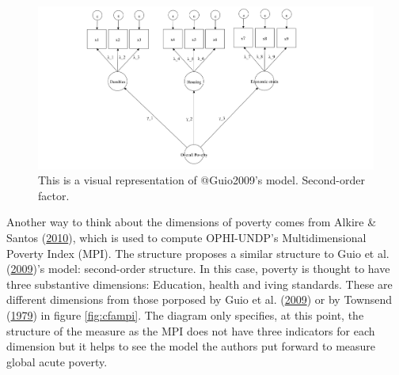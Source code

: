\documentclass[]{book}
\begin{document}
\begin{figure}[H]

{\centering \includegraphics[width=\textwidth]{Diagram_CFA_GuioModel} 

}

\caption{This is a visual representation of @Guio2009's model. Second-order factor.}\label{fig:cfaguio}
\end{figure}

Another way to think about the dimensions of poverty comes from Alkire \& Santos (\protect\hyperlink{ref-Alkire2010}{2010}), which is used to compute OPHI-UNDP's Multidimensional Poverty Index (MPI). The structure proposes a similar structure to Guio et al. (\protect\hyperlink{ref-Guio2009}{2009})'s model: second-order structure. In this case, poverty is thought to have three substantive dimensions: Education, health and iving standards. These are different dimensions from those porposed by Guio et al. (\protect\hyperlink{ref-Guio2009}{2009}) or by Townsend (\protect\hyperlink{ref-Townsend1979}{1979}) in figure \ref{fig:cfampi}. The diagram only specifies, at this point, the structure of the measure as the MPI does not have three indicators for each dimension but it helps to see the model the authors put forward to measure global acute poverty.
\end{document}
